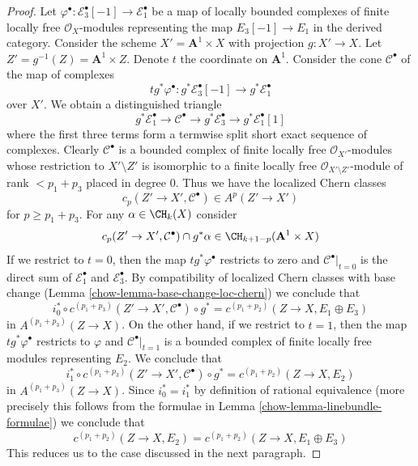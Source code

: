\begin{proof}
\medskip\noindent
Let $\varphi^\bullet : \mathcal{E}_3^\bullet[-1] \to \mathcal{E}_1^\bullet$
be a map of locally bounded complexes of finite locally free
$\mathcal{O}_X$-modules representing the map $E_3[-1] \to E_1$
in the derived category. Consider the scheme
$X' = \mathbf{A}^1 \times X$ with projection
$g : X' \to X$. Let $Z' = g^{-1}(Z) = \mathbf{A}^1 \times Z$.
Denote $t$ the coordinate on $\mathbf{A}^1$. Consider the cone
$\mathcal{C}^\bullet$ of the map of complexes
$$
t g^*\varphi^\bullet :
g^*\mathcal{E}_3^\bullet[-1]
\longrightarrow
g^*\mathcal{E}_1^\bullet
$$
over $X'$. We obtain a distinguished triangle
$$
g^*\mathcal{E}_1^\bullet \to \mathcal{C}^\bullet \to
g^*\mathcal{E}_3^\bullet \to g^*\mathcal{E}_1^\bullet[1]
$$
where the first three terms form a termwise split short exact
sequence of complexes. Clearly $\mathcal{C}^\bullet$ is a
bounded complex of finite locally free $\mathcal{O}_{X'}$-modules
whose restriction to $X' \setminus Z'$ is isomorphic to a
finite locally free
$\mathcal{O}_{X' \setminus Z'}$-module of rank $< p_1 + p_3$
placed in degree $0$. Thus we have the localized Chern classes
$$
c_p(Z' \to X', \mathcal{C}^\bullet) \in A^p(Z' \to X')
$$
for $p \geq p_1 + p_3$. For any $\alpha \in \CH_k(X)$ consider
$$
c_p(Z' \to X', \mathcal{C}^\bullet) \cap g^*\alpha
\in \CH_{k + 1 - p}(\mathbf{A}^1 \times X)
$$
If we restrict to $t = 0$, then the map $t g^*\varphi^\bullet$
restricts to zero and $\mathcal{C}^\bullet|_{t = 0}$
is the direct sum of $\mathcal{E}_1^\bullet$ and $\mathcal{E}_3^\bullet$.
By compatibility of localized Chern classes with base change
(Lemma \ref{chow-lemma-base-change-loc-chern}) we conclude that
$$
i_0^* \circ c^{(p_1 + p_3)}(Z' \to X', \mathcal{C}^\bullet) \circ g^* =
c^{(p_1 + p_2)}(Z \to X, E_1 \oplus E_3)
$$
in $A^{(p_1 + p_3)}(Z \to X)$. On the other hand, if we restrict to $t = 1$,
then the map $t g^*\varphi^\bullet$
restricts to $\varphi$ and $\mathcal{C}^\bullet|_{t = 1}$
is a bounded complex of finite locally free modules representing $E_2$.
We conclude that
$$
i_1^* \circ c^{(p_1 + p_3)}(Z' \to X', \mathcal{C}^\bullet) \circ g^* =
c^{(p_1 + p_2)}(Z \to X, E_2)
$$
in $A^{(p_1 + p_3)}(Z \to X)$. Since $i_0^* = i_1^*$ by definition of
rational equivalence (more precisely this follows from the formulae in
Lemma \ref{chow-lemma-linebundle-formulae}) we conclude that
$$
c^{(p_1 + p_2)}(Z \to X, E_2) = c^{(p_1 + p_2)}(Z \to X, E_1 \oplus E_3)
$$
This reduces us to the case discussed in the next paragraph.


\end{proof}
